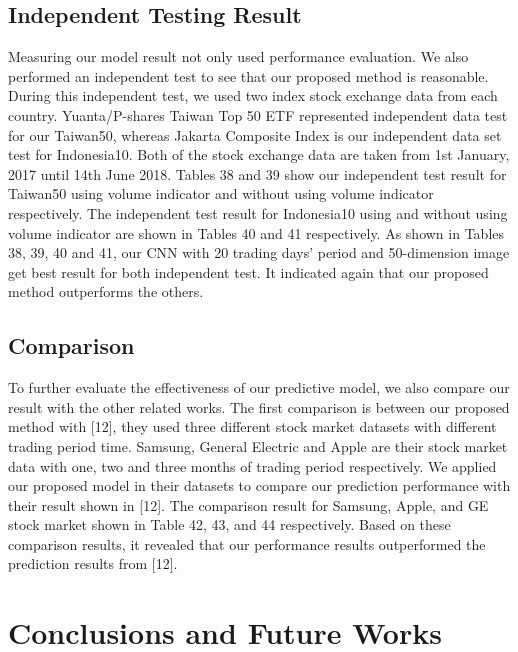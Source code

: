 \documentclass[10pt,twocolumn]{article}
\begin{document}
\subsection{Independent Testing Result}
Measuring our model result not only used performance evaluation. We also performed an independent test to see that our proposed method is reasonable. During this independent test, we used two index stock exchange data from each country. Yuanta/P-shares Taiwan Top 50 ETF represented independent data test for our Taiwan50, whereas Jakarta Composite Index is our independent data set test for Indonesia10. Both of the stock exchange data are taken from 1st January, 2017 until 14th June 2018. 
Tables 38 and 39 show our independent test result for Taiwan50 using volume indicator and without using volume indicator respectively. The independent test result for Indonesia10 using and without using volume indicator are shown in Tables 40 and 41 respectively. As shown in Tables 38, 39, 40 and 41, our CNN with 20 trading days’ period and 50-dimension image get best result for both independent test. It indicated again that our proposed method outperforms the others.
\subsection{Comparison}
To further evaluate the effectiveness of our predictive model, we also compare our result with the other related works. The first comparison is between our proposed method with [12], they used three different stock market datasets with different trading period time. Samsung, General Electric and Apple are their stock market data with one, two and three months of trading period respectively. We applied our proposed model in their datasets to compare our prediction performance with their result shown in [12]. The comparison result for Samsung, Apple, and GE stock market shown in Table 42, 43, and 44 respectively. Based on these comparison results, it revealed that our performance results outperformed the prediction results from [12].

\section{Conclusions and Future Works}
\end{document}
